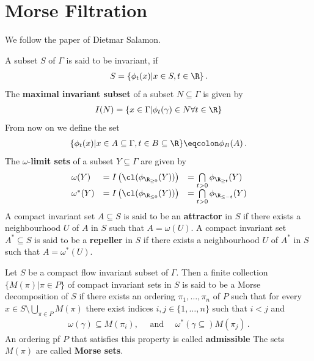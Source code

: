 \section{Morse Filtration}
We follow the paper of Dietmar Salamon.
\begin{definition}
	A subset $S$ of $\Gamma$ is said to be invariant, if
	\begin{align}
		S=\{\phi_t(x)|x\in S, t\in \R \} \, .
	\end{align}
	The \textbf{maximal invariant subset} of a subset $N\subseteq \Gamma$ is given by
	\begin{align}
		I(N)=\{ x \in \Gamma| \phi _t(\gamma)\in N \forall t\in \R \}
	\end{align} From now on we define the set
	\begin{align}
		\{\phi_t(x)| x \in A\subseteq \Gamma,t\in B\subseteq \R \}\eqcolon \phi_B(A)\, .
	\end{align}The $\omega$-\textbf{limit sets} of a subset $Y\subseteq \Gamma$ are given by
	\[
	\begin{array}{lll}
		\omega(Y) &= I\left(\cl(\phi_{\R_{\geq 0}}(Y))\right) & = \bigcap\limits_{t>0} \phi_{\R_{\geq t}}(Y) \\
		\omega^*(Y) &= I\left(\cl(\phi_{\R_{\leq 0}}(Y))\right) & = \bigcap\limits_{t>0} \phi_{\R_{\leq -t}}(Y)
	\end{array}
	\]
	A compact invariant set $A\subseteq S$ is said to be an
	\textbf{attractor} in $S$ if there exists a neighbourhood $U$ of $A$ in $S$ such that $A=\omega(U)$. A
	compact invariant set $A^* \subseteq S$ is said to be a \textbf{repeller} in $S$ if there exists a
	neighbourhood $U$ of $A^*$ in $S$ such that $A=\omega^*(U)$.
\end{definition}
\begin{definition}
	Let $S$ be a compact flow invariant subset of $\Gamma$. Then a finite collection $\{M(\pi)|\pi\in P\}$ of compact invariant sets in $S$ is said to be a Morse decomposition of $S$ if there exists an ordering $\pi_1,\dots,\pi_n$ of $P$ such that for every $ x \in S \setminus \bigcup_{\pi\in P}M(\pi)$ there exist indices $i,j\in \{1,\dots,n\}$ such that $i<j$ and
	\begin{align}
		\omega(\gamma) \subseteq M(\pi_i),\quad \text{ and } \quad\omega^*(\gamma\subseteq) M(\pi_j) \, .
	\end{align} An ordering pf $P$ that satisfies this property is called \textbf{admissible} The sets $M(\pi)$ are called \textbf{Morse sets}.
\end{definition}
